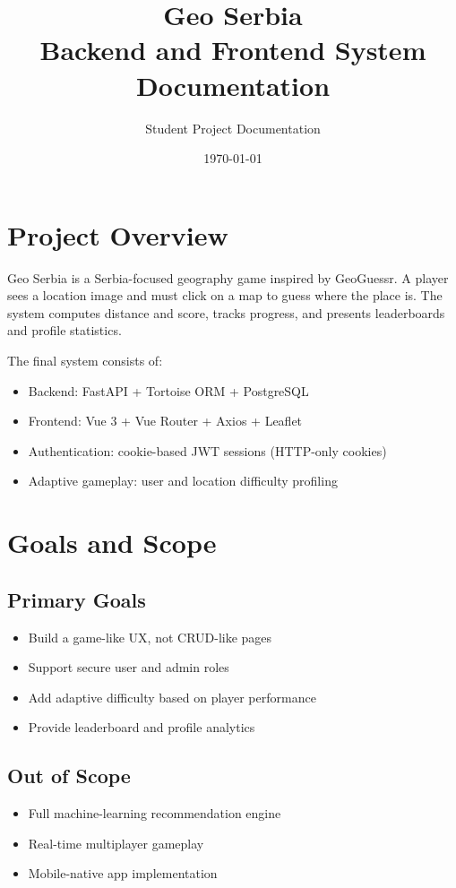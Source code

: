 \documentclass[12pt,a4paper]{article}
\title{Geo Serbia\\Backend and Frontend System Documentation}
\author{Student Project Documentation}
\date{\today}
\begin{document}
\maketitle
\tableofcontents
\newpage

\section{Project Overview}
Geo Serbia is a Serbia-focused geography game inspired by GeoGuessr. A player sees a location image and must click on a map to guess where the place is. The system computes distance and score, tracks progress, and presents leaderboards and profile statistics.

The final system consists of:
\begin{itemize}[noitemsep]
  \item Backend: FastAPI + Tortoise ORM + PostgreSQL
  \item Frontend: Vue 3 + Vue Router + Axios + Leaflet
  \item Authentication: cookie-based JWT sessions (HTTP-only cookies)
  \item Adaptive gameplay: user and location difficulty profiling
\end{itemize}

\section{Goals and Scope}
\subsection{Primary Goals}
\begin{itemize}[noitemsep]
  \item Build a game-like UX, not CRUD-like pages
  \item Support secure user and admin roles
  \item Add adaptive difficulty based on player performance
  \item Provide leaderboard and profile analytics
\end{itemize}

\subsection{Out of Scope}
\begin{itemize}[noitemsep]
  \item Full machine-learning recommendation engine
  \item Real-time multiplayer gameplay
  \item Mobile-native app implementation
\end{itemize}
\end{document}
